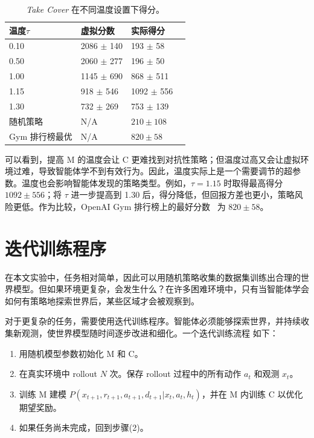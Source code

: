 \documentclass{article}
\begin{document}
\begin{table}[ht]
\label{doom_virtual_table}
\vskip -0.0in
\begin{center}
\begin{small}
\begin{sc}
\begin{tabular}{llll}
\toprule
温度$\tau$ &虚拟分数&实际得分\\
\midrule
0.10 & 2086 $\pm$ 140 & 193 $\pm$ 58 \\
0.50 & 2060 $\pm$ 277 & 196 $\pm$ 50 \\
1.00 & 1145 $\pm$ 690 & 868 $\pm$ 511 \\
1.15 & 918 $\pm$ 546 & 1092 $\pm$ 556 \\
1.30 & 732 $\pm$ 269 & 753 $\pm$ 139 \\
\midrule
随机策略& N/A & $210 \pm 108$ \\
Gym 排行榜最优& N/A & $820 \pm 58$ \\
\bottomrule
\end{tabular}
\end{sc}
\end{small}
\end{center}
\vskip -0.1in
\caption{\textit{Take Cover} 在不同温度设置下得分。}
\vskip -0.1in
\end{table}

可以看到，提高 M 的温度会让 C 更难找到对抗性策略；但温度过高又会让虚拟环境过难，导致智能体学不到有效行为。因此，温度实际上是一个需要调节的超参数。温度也会影响智能体发现的策略类型。例如，$\tau=1.15$ 时取得最高得分 $1092\pm556$；将 $\tau$ 进一步提高到 1.30 后，得分降低，但回报方差也更小，策略风险更低。作为比较，OpenAI Gym 排行榜上的最好分数~\cite{takecover} 为 $820 \pm 58$。
\vskip -0.1in
\section{迭代训练程序}

在本文实验中，任务相对简单，因此可以用随机策略收集的数据集训练出合理的世界模型。但如果环境更复杂，会发生什么？在许多困难环境中，只有当智能体学会如何有策略地探索世界后，某些区域才会被观察到。

对于更复杂的任务，需要使用迭代训练程序。智能体必须能够探索世界，并持续收集新观测，使世界模型随时间逐步改进和细化。一个迭代训练流程\cite{learning_to_think} 如下：

\begin{enumerate}
 \item 用随机模型参数初始化 M 和 C。
 \item 在真实环境中 rollout $N$ 次。保存 rollout 过程中的所有动作 $a_t$ 和观测 $x_t$。
 \item 训练 M 建模 $P(x_{t+1}, r_{t+1}, a_{t+1}, d_{t+1} | x_t, a_t, h_t)$，并在 M 内训练 C 以优化期望奖励。
 \item 如果任务尚未完成，回到步骤(2)。
\end{enumerate}
\end{document}
